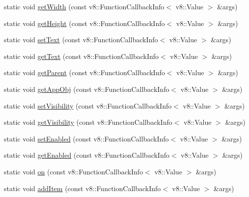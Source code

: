 \begin{DoxyCompactItemize}
static void \mbox{\hyperlink{class_rad_j_a_v_1_1_g_u_i_1_1_combobox_ae64bd7db6fd0b098695a8362c586b18d}{get\+Width}} (const v8\+::\+Function\+Callback\+Info$<$ v8\+::\+Value $>$ \&args)
\item 
static void \mbox{\hyperlink{class_rad_j_a_v_1_1_g_u_i_1_1_combobox_a30c9ad141e587f8154176a4c7ab387a1}{get\+Height}} (const v8\+::\+Function\+Callback\+Info$<$ v8\+::\+Value $>$ \&args)
\item 
static void \mbox{\hyperlink{class_rad_j_a_v_1_1_g_u_i_1_1_combobox_a432bfea26e75f58dd364234b6adbb7a4}{set\+Text}} (const v8\+::\+Function\+Callback\+Info$<$ v8\+::\+Value $>$ \&args)
\item 
static void \mbox{\hyperlink{class_rad_j_a_v_1_1_g_u_i_1_1_combobox_a1718cbba0b4e2027aad31c623a1f8c3b}{get\+Text}} (const v8\+::\+Function\+Callback\+Info$<$ v8\+::\+Value $>$ \&args)
\item 
static void \mbox{\hyperlink{class_rad_j_a_v_1_1_g_u_i_1_1_combobox_a441aa707eba8cc366d7fa056d14c0649}{get\+Parent}} (const v8\+::\+Function\+Callback\+Info$<$ v8\+::\+Value $>$ \&args)
\item 
static void \mbox{\hyperlink{class_rad_j_a_v_1_1_g_u_i_1_1_combobox_a25bd1bf76c3be41a6e93f8d5d19028fd}{get\+App\+Obj}} (const v8\+::\+Function\+Callback\+Info$<$ v8\+::\+Value $>$ \&args)
\item 
static void \mbox{\hyperlink{class_rad_j_a_v_1_1_g_u_i_1_1_combobox_af607d7b4ad357fa8c24b334a5b4998e6}{set\+Visibility}} (const v8\+::\+Function\+Callback\+Info$<$ v8\+::\+Value $>$ \&args)
\item 
static void \mbox{\hyperlink{class_rad_j_a_v_1_1_g_u_i_1_1_combobox_a419e79debb147bb72f19075566d3c6d3}{get\+Visibility}} (const v8\+::\+Function\+Callback\+Info$<$ v8\+::\+Value $>$ \&args)
\item 
static void \mbox{\hyperlink{class_rad_j_a_v_1_1_g_u_i_1_1_combobox_a22cdab8b0446ddc92381a367883e3a45}{set\+Enabled}} (const v8\+::\+Function\+Callback\+Info$<$ v8\+::\+Value $>$ \&args)
\item 
static void \mbox{\hyperlink{class_rad_j_a_v_1_1_g_u_i_1_1_combobox_acceb69193717eddfe8ecf78110a999d3}{get\+Enabled}} (const v8\+::\+Function\+Callback\+Info$<$ v8\+::\+Value $>$ \&args)
\item 
static void \mbox{\hyperlink{class_rad_j_a_v_1_1_g_u_i_1_1_combobox_a9d54495c3782b0dfcbc62de8345cd603}{on}} (const v8\+::\+Function\+Callback\+Info$<$ v8\+::\+Value $>$ \&args)
\item 
static void \mbox{\hyperlink{class_rad_j_a_v_1_1_g_u_i_1_1_combobox_ab4f4dc21d1a67c3144a897db4c7efd48}{add\+Item}} (const v8\+::\+Function\+Callback\+Info$<$ v8\+::\+Value $>$ \&args)

\end{DoxyCompactItemize}
